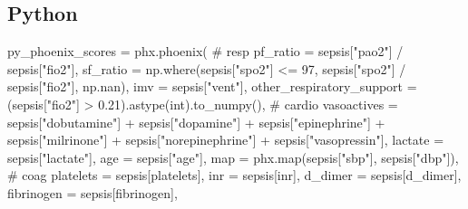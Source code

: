 \documentclass[
  letterpaper,
  DIV=11,
  numbers=noendperiod]{scrartcl}
\newenvironment{Shaded}{\begin{snugshade}}{\end{snugshade}}
\newcommand{\BuiltInTok}[1]{\textcolor[rgb]{0.00,0.23,0.31}{#1}}
\newcommand{\CommentTok}[1]{\textcolor[rgb]{0.37,0.37,0.37}{#1}}
\newcommand{\DecValTok}[1]{\textcolor[rgb]{0.68,0.00,0.00}{#1}}
\newcommand{\FloatTok}[1]{\textcolor[rgb]{0.68,0.00,0.00}{#1}}
\newcommand{\NormalTok}[1]{\textcolor[rgb]{0.00,0.23,0.31}{#1}}
\newcommand{\OperatorTok}[1]{\textcolor[rgb]{0.37,0.37,0.37}{#1}}
\newcommand{\StringTok}[1]{\textcolor[rgb]{0.13,0.47,0.30}{#1}}
\begin{document}
\subsection{Python}\label{python-10}

\begin{Shaded}
\begin{Highlighting}[]
\NormalTok{py\_phoenix\_scores }\OperatorTok{=}\NormalTok{ phx.phoenix(}
    \CommentTok{\# resp}
\NormalTok{    pf\_ratio }\OperatorTok{=}\NormalTok{ sepsis[}\StringTok{"pao2"}\NormalTok{] }\OperatorTok{/}\NormalTok{ sepsis[}\StringTok{"fio2"}\NormalTok{],}
\NormalTok{    sf\_ratio }\OperatorTok{=}\NormalTok{ np.where(sepsis[}\StringTok{"spo2"}\NormalTok{] }\OperatorTok{\textless{}=} \DecValTok{97}\NormalTok{, sepsis[}\StringTok{"spo2"}\NormalTok{] }\OperatorTok{/}\NormalTok{ sepsis[}\StringTok{"fio2"}\NormalTok{], np.nan),}
\NormalTok{    imv      }\OperatorTok{=}\NormalTok{ sepsis[}\StringTok{"vent"}\NormalTok{],}
\NormalTok{    other\_respiratory\_support }\OperatorTok{=}\NormalTok{ (sepsis[}\StringTok{"fio2"}\NormalTok{] }\OperatorTok{\textgreater{}} \FloatTok{0.21}\NormalTok{).astype(}\BuiltInTok{int}\NormalTok{).to\_numpy(),}
    \CommentTok{\# cardio}
\NormalTok{    vasoactives }\OperatorTok{=}\NormalTok{ sepsis[}\StringTok{"dobutamine"}\NormalTok{] }\OperatorTok{+}\NormalTok{ sepsis[}\StringTok{"dopamine"}\NormalTok{] }\OperatorTok{+}
\NormalTok{                  sepsis[}\StringTok{"epinephrine"}\NormalTok{] }\OperatorTok{+}\NormalTok{ sepsis[}\StringTok{"milrinone"}\NormalTok{] }\OperatorTok{+}
\NormalTok{                  sepsis[}\StringTok{"norepinephrine"}\NormalTok{] }\OperatorTok{+}\NormalTok{ sepsis[}\StringTok{"vasopressin"}\NormalTok{],}
\NormalTok{    lactate }\OperatorTok{=}\NormalTok{ sepsis[}\StringTok{"lactate"}\NormalTok{],}
\NormalTok{    age }\OperatorTok{=}\NormalTok{ sepsis[}\StringTok{"age"}\NormalTok{],}
    \BuiltInTok{map} \OperatorTok{=}\NormalTok{ phx.}\BuiltInTok{map}\NormalTok{(sepsis[}\StringTok{"sbp"}\NormalTok{], sepsis[}\StringTok{"dbp"}\NormalTok{]),}
    \CommentTok{\# coag}
\NormalTok{    platelets }\OperatorTok{=}\NormalTok{ sepsis[}\StringTok{\textquotesingle{}platelets\textquotesingle{}}\NormalTok{],}
\NormalTok{    inr }\OperatorTok{=}\NormalTok{ sepsis[}\StringTok{\textquotesingle{}inr\textquotesingle{}}\NormalTok{],}
\NormalTok{    d\_dimer }\OperatorTok{=}\NormalTok{ sepsis[}\StringTok{\textquotesingle{}d\_dimer\textquotesingle{}}\NormalTok{],}
\NormalTok{    fibrinogen }\OperatorTok{=}\NormalTok{ sepsis[}\StringTok{\textquotesingle{}fibrinogen\textquotesingle{}}\NormalTok{],}

\end{Highlighting}
\end{Shaded}
\end{document}
